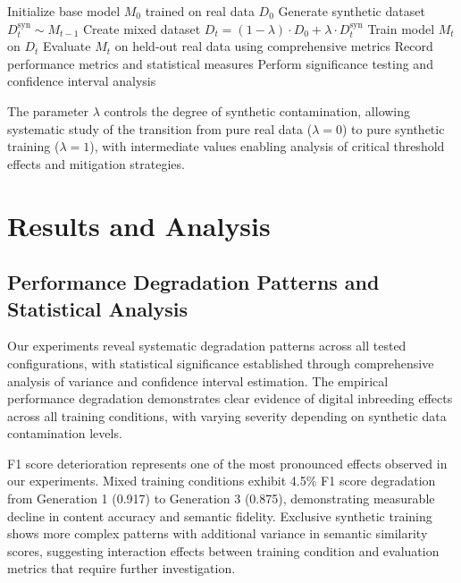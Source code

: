 \documentclass{article}
\begin{document}
\begin{algorithm}
\caption{Digital Inbreeding Simulation}
\begin{algorithmic}[1]
\STATE Initialize base model $M_0$ trained on real data $D_0$
    \STATE Generate synthetic dataset $D_t^{\text{syn}} \sim M_{t-1}$
    \STATE Create mixed dataset $D_t = (1-\lambda) \cdot D_0 + \lambda \cdot D_t^{\text{syn}}$
    \STATE Train model $M_t$ on $D_t$
    \STATE Evaluate $M_t$ on held-out real data using comprehensive metrics
    \STATE Record performance metrics and statistical measures
    \STATE Perform significance testing and confidence interval analysis
\ENDFOR
\end{algorithmic}
\end{algorithm}

The parameter $\lambda$ controls the degree of synthetic contamination, allowing systematic study of the transition from pure real data ($\lambda = 0$) to pure synthetic training ($\lambda = 1$), with intermediate values enabling analysis of critical threshold effects and mitigation strategies.

\section{Results and Analysis}

\subsection{Performance Degradation Patterns and Statistical Analysis}

Our experiments reveal systematic degradation patterns across all tested configurations, with statistical significance established through comprehensive analysis of variance and confidence interval estimation. The empirical performance degradation demonstrates clear evidence of digital inbreeding effects across all training conditions, with varying severity depending on synthetic data contamination levels.

F1 score deterioration represents one of the most pronounced effects observed in our experiments. Mixed training conditions exhibit 4.5\% F1 score degradation from Generation 1 (0.917) to Generation 3 (0.875), demonstrating measurable decline in content accuracy and semantic fidelity. Exclusive synthetic training shows more complex patterns with additional variance in semantic similarity scores, suggesting interaction effects between training condition and evaluation metrics that require further investigation.
\end{document}
